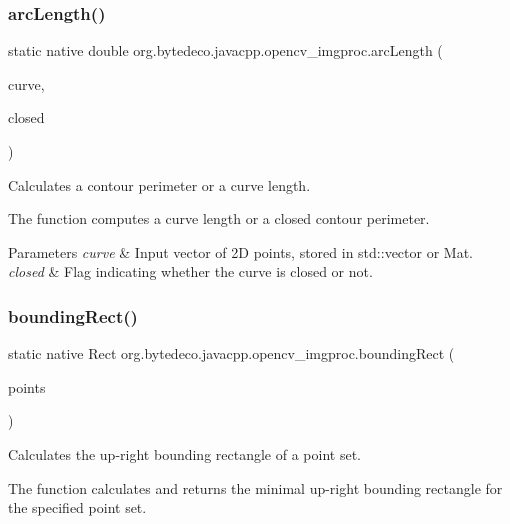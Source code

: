 \subsubsection{\texorpdfstring{arc\+Length()}{arcLength()}}
{\footnotesize\ttfamily static native double org.\+bytedeco.\+javacpp.\+opencv\+\_\+imgproc.\+arc\+Length (\begin{DoxyParamCaption}\item[{@By\+Val Mat}]{curve,  }\item[{@Cast(\char`\"{}bool\char`\"{}) boolean}]{closed }\end{DoxyParamCaption})\hspace{0.3cm}{\ttfamily [static]}}



Calculates a contour perimeter or a curve length. 

The function computes a curve length or a closed contour perimeter. 


\begin{DoxyParams}{Parameters}
{\em curve} & Input vector of 2D points, stored in std\+::vector or Mat. \\
\hline
{\em closed} & Flag indicating whether the curve is closed or not. \\
\hline
\end{DoxyParams}
\mbox{\label{group__imgproc__shape_ga8e749f0c2a90af2956b90b60689d6602}} 
\subsubsection{\texorpdfstring{bounding\+Rect()}{boundingRect()}}
{\footnotesize\ttfamily static native Rect org.\+bytedeco.\+javacpp.\+opencv\+\_\+imgproc.\+bounding\+Rect (\begin{DoxyParamCaption}\item[{@By\+Val Mat}]{points }\end{DoxyParamCaption})\hspace{0.3cm}{\ttfamily [static]}}



Calculates the up-\/right bounding rectangle of a point set. 

The function calculates and returns the minimal up-\/right bounding rectangle for the specified point set. 



